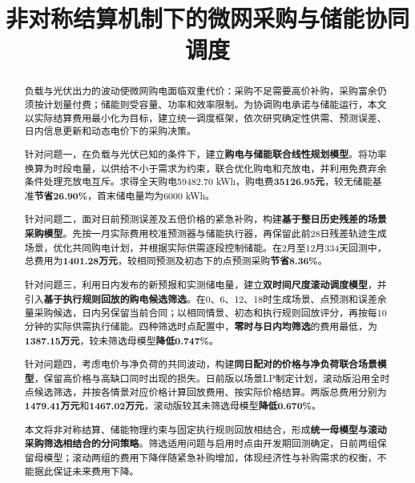 \documentclass[withoutpreface,bwprint]{cumcmthesis}
\title{非对称结算机制下的微网采购与储能协同调度}
\begin{document}
\maketitle
\begin{abstract}
\setlength{\parskip}{0.45em}
负载与光伏出力的波动使微网购电面临双重代价：采购不足需要高价补购，采购富余仍须按计划量付费；储能则受容量、功率和效率限制。为协调购电承诺与储能运行，本文以实际结算费用最小化为目标，建立统一调度框架，依次研究确定性供需、预测误差、日内信息更新和动态电价下的采购决策。

针对问题一，在负载与光伏已知的条件下，建立\textbf{\heiti 购电与储能联合线性规划模型}。将功率换算为时段电量，以供给不小于需求为约束，联合优化购电和充放电，并利用免费弃余条件处理充放电互斥。求得全天购电59482.70 kWh，购电费\textbf{35126.95元}，较无储能基准\textbf{节省26.90\%}，首末储电量均为6000 kWh。

针对问题二，面对日前预测误差及五倍价格的紧急补购，构建\textbf{\heiti 基于整日历史残差的场景采购模型}。先按一月实际费用校准预测器与储能执行器，再保留此前28日残差轨迹生成场景，优化共同购电计划，并根据实际供需逐段控制储能。在2月至12月334天回测中，总费用为\textbf{1401.28万元}，较相同预测及初态下的点预测采购\textbf{节省8.36\%}。

针对问题三，利用日内发布的新预报和实测储电量，建立\textbf{\heiti 双时间尺度滚动调度模型}，并引入\textbf{\heiti 基于执行规则回放的购电候选筛选}。在0、6、12、18时生成场景、点预测和误差余量采购候选，日内另保留当前合同；以相同情景、初态和执行规则回放评分，再按每10分钟的实际供需执行储能。四种筛选时点配置中，\textbf{\heiti 零时与日内均筛选}的费用最低，为\textbf{1387.15万元}，较未筛选母模型\textbf{降低0.747\%}。

针对问题四，考虑电价与净负荷的共同波动，构建\textbf{\heiti 同日配对的价格与净负荷联合场景模型}，保留高价格与高缺口同时出现的损失。日前版以场景LP制定计划，滚动版沿用全时点候选筛选，并按各情景对应价格计算回放费用、按实际价格结算。两版总费用分别为\textbf{1479.41万元}和\textbf{1467.02万元}，滚动版较其未筛选母模型\textbf{降低0.670\%}。

本文将非对称结算、储能物理约束与固定执行规则回放相结合，形成\textbf{\heiti 统一母模型与滚动采购筛选相结合的分问策略}。筛选适用问题与启用时点由开发期回测确定，日前两组保留母模型；滚动两组的费用下降伴随紧急补购增加，体现经济性与补购需求的权衡，不能据此保证未来费用下降。

\end{abstract}


\FloatBarrier

\FloatBarrier

\FloatBarrier

\FloatBarrier

\FloatBarrier


\FloatBarrier
{}


\clearpage
\begin{appendices}

\end{appendices}
\end{document}
